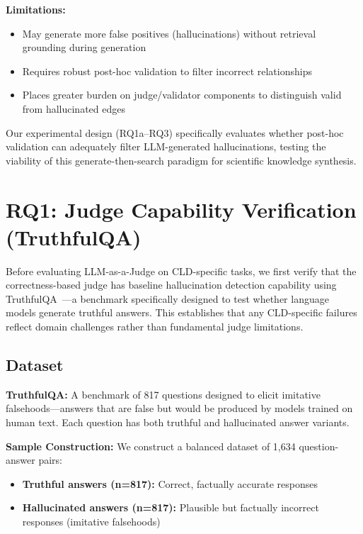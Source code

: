 \textbf{Limitations:}
\begin{itemize}[noitemsep]
    \item May generate more false positives (hallucinations) without retrieval grounding during generation
    \item Requires robust post-hoc validation to filter incorrect relationships
    \item Places greater burden on judge/validator components to distinguish valid from hallucinated edges
\end{itemize}

Our experimental design (RQ1a--RQ3) specifically evaluates whether post-hoc validation can adequately filter LLM-generated hallucinations, testing the viability of this generate-then-search paradigm for scientific knowledge synthesis.

\section{RQ1: Judge Capability Verification (TruthfulQA)}

Before evaluating LLM-as-a-Judge on CLD-specific tasks, we first verify that the correctness-based judge has baseline hallucination detection capability using TruthfulQA~\cite{lin2022truthfulqa}---a benchmark specifically designed to test whether language models generate truthful answers. This establishes that any CLD-specific failures reflect domain challenges rather than fundamental judge limitations.

\subsection{Dataset}

\textbf{TruthfulQA:} A benchmark of 817 questions designed to elicit imitative falsehoods---answers that are false but would be produced by models trained on human text. Each question has both truthful and hallucinated answer variants.

\textbf{Sample Construction:} We construct a balanced dataset of 1,634 question-answer pairs:
\begin{itemize}[noitemsep]
    \item \textbf{Truthful answers (n=817):} Correct, factually accurate responses
    \item \textbf{Hallucinated answers (n=817):} Plausible but factually incorrect responses (imitative falsehoods)
\end{itemize}

